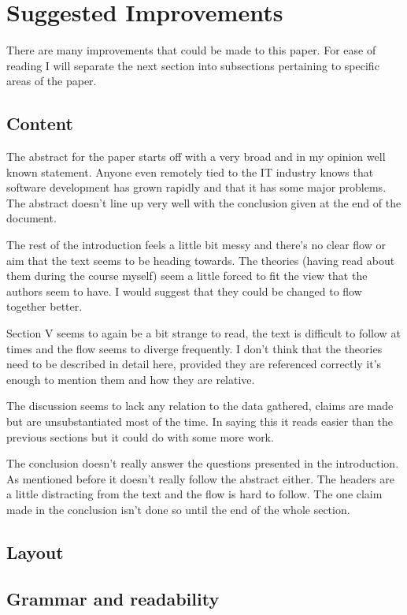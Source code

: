 \documentclass[conference]{IEEEtran}
\begin{document}
\section{Suggested Improvements}

There are many improvements that could be made to this paper. For ease of reading I will separate the next section into subsections pertaining to specific areas of the paper.

\subsection*{Content}
The abstract for the paper starts off with a very broad and in my opinion well known statement. Anyone even remotely tied to the IT industry knows that software development has grown rapidly and that it has some major problems. The abstract doesn't line up very well with the conclusion given at the end of the document. 

The rest of the introduction feels a little bit messy and there's no clear flow or aim that the text seems to be heading towards. The theories (having read about them during the course myself) seem a little forced to fit the view that the authors seem to have. I would suggest that they could be changed to flow together better.

Section V seems to again be a bit strange to read, the text is difficult to follow at times and the flow seems to diverge frequently. I don't think that the theories need to be described in detail here, provided they are referenced correctly it's enough to mention them and how they are relative.

The discussion seems to lack any relation to the data gathered, claims are made but are unsubstantiated most of the time. In saying this it reads easier than the previous sections but it could do with some more work. 

The conclusion doesn't really answer the questions presented in the introduction. As mentioned before it doesn't really follow the abstract either. The headers are a little distracting from the text and the flow is hard to follow. The one claim made in the conclusion isn't done so until the end of the whole section. 


\subsection*{Layout}
\subsection*{Grammar and readability}

\end{document}
